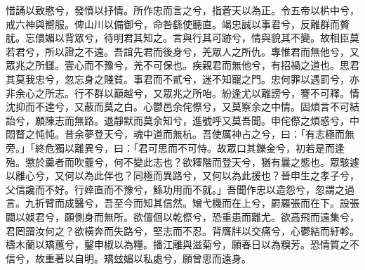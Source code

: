 
\begin{pinyinscope}
惜誦以致愍兮，發憤以抒情。所作忠而言之兮，指蒼天以為正。令五帝以㭊中兮，戒六神與嚮服。俾山川以備御兮，命咎繇使聽直。竭忠誠以事君兮，反離群而贅肬。忘儇媚以背眾兮，待明君其知之。言與行其可跡兮，情與貌其不變。故相臣莫若君兮，所以證之不遠。吾誼先君而後身兮，羌眾人之所仇。專惟君而無他兮，又眾兆之所讎。壹心而不豫兮，羌不可保也。疾親君而無他兮，有招禍之道也。思君其莫我忠兮，忽忘身之賤貧。事君而不貳兮，迷不知寵之門。忠何罪以遇罰兮，亦非余心之所志。行不群以巔越兮，又眾兆之所咍。紛逢尤以離謗兮，謇不可釋。情沈抑而不達兮，又蔽而莫之白。心鬱邑余侘傺兮，又莫察余之中情。固煩言不可結詒兮，願陳志而無路。退靜默而莫余知兮，進號呼又莫吾聞。申侘傺之煩惑兮，中悶瞀之忳忳。昔余夢登天兮，魂中道而無杭。吾使厲神占之兮，曰：「有志極而無旁。」「終危獨以離異兮，曰：「君可思而不可恃。故眾口其鑠金兮，初若是而逢殆。懲於羹者而吹虀兮，何不變此志也？欲釋階而登天兮，猶有曩之態也。眾駭遽以離心兮，又何以為此伴也？同極而異路兮，又何以為此援也？晉申生之孝子兮，父信讒而不好。行婞直而不豫兮，鯀功用而不就。」吾聞作忠以造怨兮，忽謂之過言。九折臂而成醫兮，吾至今而知其信然。矰弋機而在上兮，罻羅張而在下。設張闢以娛君兮，願側身而無所。欲儃佪以乾傺兮，恐重患而離尤。欲高飛而遠集兮，君罔謂汝何之？欲橫奔而失路兮，堅志而不忍。背膺牉以交痛兮，心鬱結而紆軫。檮木蘭以矯蕙兮，鑿申椒以為糧。播江離與滋菊兮，願春日以為糗芳。恐情質之不信兮，故重著以自明。矯玆媚以私處兮，願曾思而遠身。


\end{pinyinscope}